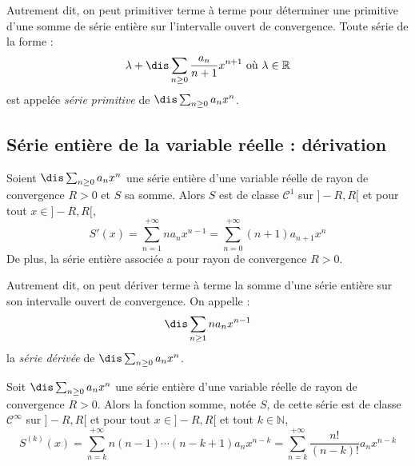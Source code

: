 \documentclass[a4paper,10pt]{report}
\begin{document}
\noindent Autrement dit, on peut \og primitiver \fg terme à terme pour déterminer une primitive d'une somme de série entière sur l'intervalle ouvert de convergence. Toute série de la forme :
$$ \lambda + \dis \sum_{n\geq 0}  \dfrac{a_n}{n+1} x^{n+1} \hbox{ où } \lambda \in \mathbb{R}$$
est appelée \textit{série primitive} de $\dis \sum_{n \geq 0} a_n x^n$.

\begin{preuve}

\vspace{7cm}
\end{preuve}

\newpage

\phantom{test}

\vspace{4cm}

\subsection{Série entière de la variable réelle : dérivation}

\begin{thm}
Soient $\dis \sum_{n \geq 0} a_n x^n$ une série entière d'une variable réelle de rayon de convergence $R>0$ et $S$ sa somme. Alors $S$ est de classe $\mathcal{C}^1$ sur $]-R,R[$ et pour tout $x \in ]-R,R[$,
$$S'(x) = \sum_{n=1}^{+ \infty} n a_n x^{n-1} = \sum_{n=0}^{+ \infty} (n+1) a_{n+1} x^n$$
De plus, la série entière associée a pour rayon de convergence $R>0$.
\end{thm}

\noindent Autrement dit, on peut dériver terme à terme la somme d'une série entière sur son intervalle ouvert de convergence. On appelle :
$$ \dis \sum_{n \geq 1} n a_n x^{n-1}$$
la \textit{série dérivée} de $\dis \sum_{n \geq 0} a_n x^n$.

\begin{preuve}
\vspace{6cm}
\end{preuve}
%
%
%
\begin{thm} Soit $\dis \sum_{n \geq 0} a_n x^n$ une série entière d'une variable réelle de rayon de convergence $R>0$. Alors la fonction somme, notée $S$, de cette série est de classe $\mathcal{C}^{\infty}$ sur $]-R,R[$ et pour tout $x \in ]-R,R[$ et tout $k \in \mathbb{N}$,
$$S^{(k)}(x) = \sum_{n=k}^{+ \infty} n(n-1)\cdots(n-k+1) a_n x^{n-k} = \sum_{n=k}^{+ \infty} \frac{n!}{(n-k)!} a_n x^{n-k}$$
\end{thm}
\end{document}

